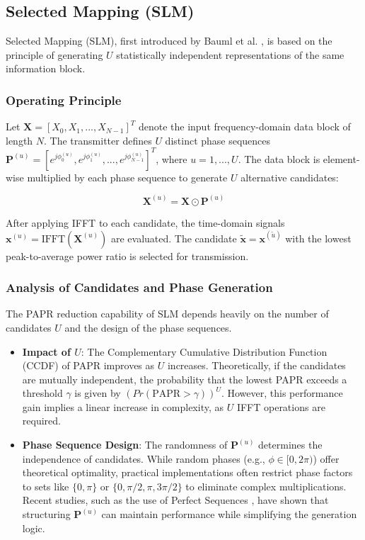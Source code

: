 \documentclass[conference]{IEEEtran}
\begin{document}
\subsection{Selected Mapping (SLM)}
Selected Mapping (SLM), first introduced by Bauml et al. \cite{ref5}, is based on the principle of generating $U$ statistically independent representations of the same information block.

\subsubsection{Operating Principle}
Let $\mathbf{X} = [X_0, X_1, ..., X_{N-1}]^T$ denote the input frequency-domain data block of length $N$. The transmitter defines $U$ distinct phase sequences $\mathbf{P}^{(u)} = [e^{j\phi_{0}^{(u)}}, e^{j\phi_{1}^{(u)}}, ..., e^{j\phi_{N-1}^{(u)}}]^T$, where $u = 1, ..., U$. The data block is element-wise multiplied by each phase sequence to generate $U$ alternative candidates:

\begin{equation}
    \mathbf{X}^{(u)} = \mathbf{X} \odot \mathbf{P}^{(u)}
\end{equation}

After applying IFFT to each candidate, the time-domain signals $\mathbf{x}^{(u)} = \text{IFFT}(\mathbf{X}^{(u)})$ are evaluated. The candidate $\tilde{\mathbf{x}} = \mathbf{x}^{(\tilde{u})}$ with the lowest peak-to-average power ratio is selected for transmission.

\subsubsection{Analysis of Candidates and Phase Generation}
The PAPR reduction capability of SLM depends heavily on the number of candidates $U$ and the design of the phase sequences.

\begin{itemize}
    \item \textbf{Impact of $U$}: The Complementary Cumulative Distribution Function (CCDF) of PAPR improves as $U$ increases. Theoretically, if the candidates are mutually independent, the probability that the lowest PAPR exceeds a threshold $\gamma$ is given by $(Pr(\text{PAPR} > \gamma))^U$. However, this performance gain implies a linear increase in complexity, as $U$ IFFT operations are required.
    \item \textbf{Phase Sequence Design}: The randomness of $\mathbf{P}^{(u)}$ determines the independence of candidates. While random phases (e.g., $\phi \in [0, 2\pi)$) offer theoretical optimality, practical implementations often restrict phase factors to sets like $\{0, \pi\}$ or $\{0, \pi/2, \pi, 3\pi/2\}$ to eliminate complex multiplications. Recent studies, such as the use of Perfect Sequences \cite{ref7}, have shown that structuring $\mathbf{P}^{(u)}$ can maintain performance while simplifying the generation logic.
\end{itemize}
\end{document}
